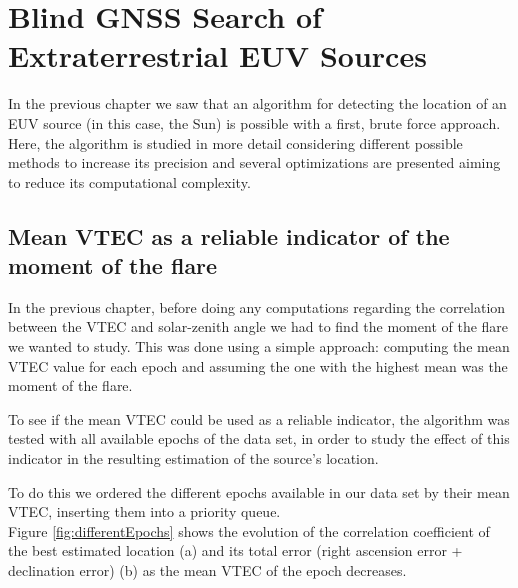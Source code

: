 \chapter{Blind GNSS Search of Extraterrestrial EUV Sources}

In the previous chapter we saw that an algorithm for detecting the location of an EUV source (in this case, the Sun) is possible with a first, brute force approach. Here, the algorithm is studied in more detail considering different possible methods to increase its precision and several optimizations are presented aiming to reduce its computational complexity.

\section{Mean VTEC as a reliable indicator of the moment of the flare}

In the previous chapter, before doing any computations regarding the correlation between the VTEC and solar-zenith angle we had to find the moment of the flare we wanted to study. This was done using a simple approach: computing the mean VTEC value for each epoch and assuming the one with the highest mean was the moment of the flare.

To see if the mean VTEC could be used as a reliable indicator, the algorithm was tested with all available epochs of the data set, in order to study the effect of this indicator in the resulting estimation of the source's location.

To do this we ordered the different epochs available in our data set by their mean VTEC, inserting them into a priority queue. \\

Figure \ref{fig:differentEpochs} shows the evolution of the correlation coefficient of the best estimated location (a) and its total error (right ascension error + declination error) (b) as the mean VTEC of the epoch decreases.

\clearpage

